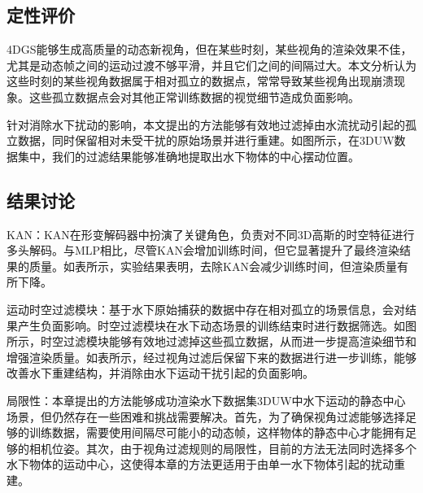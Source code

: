 \subsection{定性评价}
4DGS能够生成高质量的动态新视角，但在某些时刻，某些视角的渲染效果不佳，尤其是动态帧之间的运动过渡不够平滑，并且它们之间的间隔过大。本文分析认为这些时刻的某些视角数据属于相对孤立的数据点，常常导致某些视角出现崩溃现象。这些孤立数据点会对其他正常训练数据的视觉细节造成负面影响。

针对消除水下扰动的影响，本文提出的方法能够有效地过滤掉由水流扰动引起的孤立数据，同时保留相对未受干扰的原始场景并进行重建。如图所示，在3DUW数据集中，我们的过滤结果能够准确地提取出水下物体的中心摆动位置。

\subsection{结果讨论}
KAN：KAN在形变解码器中扮演了关键角色，负责对不同3D高斯的时空特征进行多头解码。与MLP相比，尽管KAN会增加训练时间，但它显著提升了最终渲染结果的质量。如表所示，实验结果表明，去除KAN会减少训练时间，但渲染质量有所下降。

运动时空过滤模块：基于水下原始捕获的数据中存在相对孤立的场景信息，会对结果产生负面影响。时空过滤模块在水下动态场景的训练结束时进行数据筛选。如图所示，时空过滤模块能够有效地过滤掉这些孤立数据，从而进一步提高渲染细节和增强渲染质量。如表所示，经过视角过滤后保留下来的数据进行进一步训练，能够改善水下重建结构，并消除由水下运动干扰引起的负面影响。

局限性：本章提出的方法能够成功渲染水下数据集3DUW中水下运动的静态中心场景，但仍然存在一些困难和挑战需要解决。首先，为了确保视角过滤能够选择足够的训练数据，需要使用间隔尽可能小的动态帧，这样物体的静态中心才能拥有足够的相机位姿。其次，由于视角过滤规则的局限性，目前的方法无法同时选择多个水下物体的运动中心，这使得本章的方法更适用于由单一水下物体引起的扰动重建。
